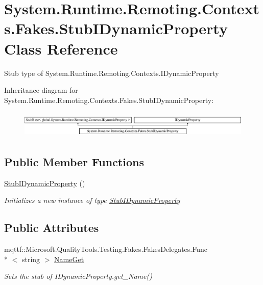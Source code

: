 \hypertarget{class_system_1_1_runtime_1_1_remoting_1_1_contexts_1_1_fakes_1_1_stub_i_dynamic_property}{\section{System.\-Runtime.\-Remoting.\-Contexts.\-Fakes.\-Stub\-I\-Dynamic\-Property Class Reference}
\label{class_system_1_1_runtime_1_1_remoting_1_1_contexts_1_1_fakes_1_1_stub_i_dynamic_property}
}


Stub type of System.\-Runtime.\-Remoting.\-Contexts.\-I\-Dynamic\-Property 


Inheritance diagram for System.\-Runtime.\-Remoting.\-Contexts.\-Fakes.\-Stub\-I\-Dynamic\-Property\-:\begin{figure}[H]
\begin{center}
\leavevmode
\includegraphics[height=1.287356cm]{class_system_1_1_runtime_1_1_remoting_1_1_contexts_1_1_fakes_1_1_stub_i_dynamic_property}
\end{center}
\end{figure}
\subsection*{Public Member Functions}
\begin{DoxyCompactItemize}
\item 
\hyperlink{class_system_1_1_runtime_1_1_remoting_1_1_contexts_1_1_fakes_1_1_stub_i_dynamic_property_ac8cb3a0669ed479889e5f78e90935ab4}{Stub\-I\-Dynamic\-Property} ()
\begin{DoxyCompactList}\small\item\em Initializes a new instance of type \hyperlink{class_system_1_1_runtime_1_1_remoting_1_1_contexts_1_1_fakes_1_1_stub_i_dynamic_property}{Stub\-I\-Dynamic\-Property}\end{DoxyCompactList}\end{DoxyCompactItemize}
\subsection*{Public Attributes}
\begin{DoxyCompactItemize}
\item 
mqttf\-::\-Microsoft.\-Quality\-Tools.\-Testing.\-Fakes.\-Fakes\-Delegates.\-Func\\*
$<$ string $>$ \hyperlink{class_system_1_1_runtime_1_1_remoting_1_1_contexts_1_1_fakes_1_1_stub_i_dynamic_property_ac4ca618dcfae02ff82d84a13087631b6}{Name\-Get}
\begin{DoxyCompactList}\small\item\em Sets the stub of I\-Dynamic\-Property.\-get\-\_\-\-Name()\end{DoxyCompactList}\end{DoxyCompactItemize}


